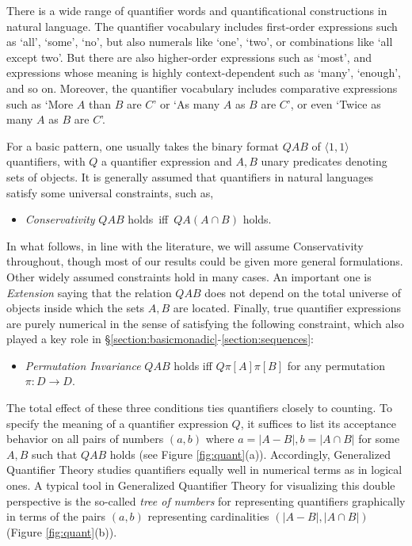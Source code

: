 \documentclass[12pt,oneside,reqno]{amsart}
\theoremstyle{definition}
\begin{document}
\vspace{1ex}

There is a wide range of quantifier words and quantificational constructions in natural language. The quantifier vocabulary includes first-order expressions such as `all', `some', `no', but also numerals like `one', `two', or combinations like `all except two'. But there are also higher-order expressions such as `most', and expressions whose meaning is highly context-dependent such as `many', `enough', and so on. Moreover, the quantifier vocabulary includes comparative expressions such as `More $A$ than $B$ are $C$' or `As many $A$ as $B$ are $C$', or even `Twice as many $A$ as $B$ are $C$'.



For a  basic pattern, one usually takes the binary format $Q AB$ of $\langle 1,1 \rangle$ quantifiers, with $Q$ a quantifier expression and $A, B$  unary predicates denoting sets of objects. It is generally assumed that quantifiers in natural languages satisfy some universal constraints, such as,\vspace{0.5ex}
\begin{itemize}
    \item[] \emph{Conservativity} \quad $Q AB$ holds \,iff\, $Q A(A\cap B)$ holds.
\end{itemize}\vspace{0.5ex}
In what follows, in line with the literature, we will assume Conservativity throughout, though most of our results could be given more general formulations. 
Other widely assumed constraints  hold in many cases. An important one is \emph{Extension} saying that the  relation $Q AB$ does not depend on the total universe of objects inside which the sets $A, B$ are located. Finally, true quantifier expressions are purely numerical in the sense of satisfying the following constraint, which also played a key role in \S\ref{section:basicmonadic}-\ref{section:sequences}:\vspace{1ex}
\begin{itemize}
    \item[]  \emph{Permutation Invariance} \quad $Q AB$ holds iff $Q \pi[A]\pi[B]$ for any permutation $\pi:D\rightarrow D$.
\end{itemize}\vspace{1ex}
The total effect of these three  conditions ties quantifiers closely to counting. To specify the meaning of a quantifier expression $Q$, it suffices to list its acceptance behavior on all pairs of numbers $(a, b)$ where $a = |A - B|, b = |A \cap B |$ for some $A, B$ such that  $Q AB$ holds (see Figure \ref{fig:quant}(a)). Accordingly, Generalized Quantifier Theory studies quantifiers equally well in numerical terms as in logical ones. A typical tool in Generalized Quantifier Theory for visualizing this double perspective is the so-called {\it tree of numbers} for representing quantifiers graphically in terms of the pairs $(a,b)$ representing cardinalities $(|A-B|, |A\cap B|)$ (Figure \ref{fig:quant}(b)). 
\end{document}
